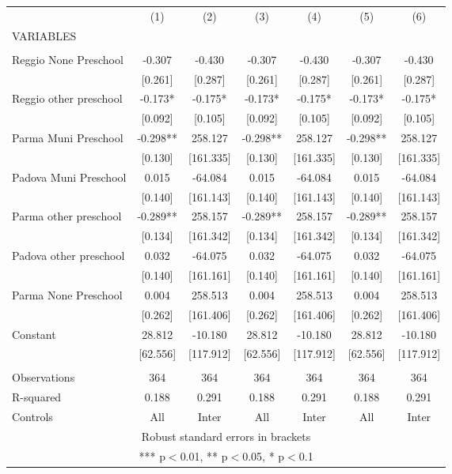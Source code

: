 \begin{tabular}{lcccccc} \hline
 & (1) & (2) & (3) & (4) & (5) & (6) \\
VARIABLES &  &  &  &  &  &  \\ \hline
 &  &  &  &  &  &  \\
Reggio None Preschool & -0.307 & -0.430 & -0.307 & -0.430 & -0.307 & -0.430 \\
 & [0.261] & [0.287] & [0.261] & [0.287] & [0.261] & [0.287] \\
Reggio other preschool & -0.173* & -0.175* & -0.173* & -0.175* & -0.173* & -0.175* \\
 & [0.092] & [0.105] & [0.092] & [0.105] & [0.092] & [0.105] \\
Parma Muni Preschool & -0.298** & 258.127 & -0.298** & 258.127 & -0.298** & 258.127 \\
 & [0.130] & [161.335] & [0.130] & [161.335] & [0.130] & [161.335] \\
Padova Muni Preschool & 0.015 & -64.084 & 0.015 & -64.084 & 0.015 & -64.084 \\
 & [0.140] & [161.143] & [0.140] & [161.143] & [0.140] & [161.143] \\
Parma other preschool & -0.289** & 258.157 & -0.289** & 258.157 & -0.289** & 258.157 \\
 & [0.134] & [161.342] & [0.134] & [161.342] & [0.134] & [161.342] \\
Padova other preschool & 0.032 & -64.075 & 0.032 & -64.075 & 0.032 & -64.075 \\
 & [0.140] & [161.161] & [0.140] & [161.161] & [0.140] & [161.161] \\
Parma None Preschool & 0.004 & 258.513 & 0.004 & 258.513 & 0.004 & 258.513 \\
 & [0.262] & [161.406] & [0.262] & [161.406] & [0.262] & [161.406] \\
Constant & 28.812 & -10.180 & 28.812 & -10.180 & 28.812 & -10.180 \\
 & [62.556] & [117.912] & [62.556] & [117.912] & [62.556] & [117.912] \\
 &  &  &  &  &  &  \\
Observations & 364 & 364 & 364 & 364 & 364 & 364 \\
R-squared & 0.188 & 0.291 & 0.188 & 0.291 & 0.188 & 0.291 \\
 Controls & All & Inter & All & Inter & All & Inter \\ \hline
\multicolumn{7}{c}{ Robust standard errors in brackets} \\
\multicolumn{7}{c}{ *** p$<$0.01, ** p$<$0.05, * p$<$0.1} \\
\end{tabular}
